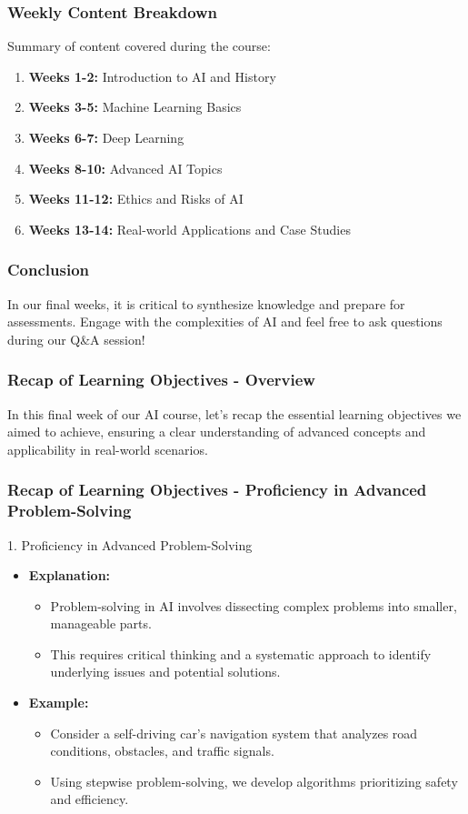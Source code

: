 \documentclass[aspectratio=169]{beamer}
\begin{document}
\begin{frame}[fragile]
    \frametitle{Weekly Content Breakdown}
    Summary of content covered during the course:
    \begin{enumerate}
        \item \textbf{Weeks 1-2:} Introduction to AI and History
        \item \textbf{Weeks 3-5:} Machine Learning Basics
        \item \textbf{Weeks 6-7:} Deep Learning
        \item \textbf{Weeks 8-10:} Advanced AI Topics
        \item \textbf{Weeks 11-12:} Ethics and Risks of AI
        \item \textbf{Weeks 13-14:} Real-world Applications and Case Studies
    \end{enumerate}
\end{frame}

\begin{frame}[fragile]
    \frametitle{Conclusion}
    In our final weeks, it is critical to synthesize knowledge and prepare for assessments. Engage with the complexities of AI and feel free to ask questions during our Q\&A session!
\end{frame}

\begin{frame}[fragile]
    \frametitle{Recap of Learning Objectives - Overview}
    In this final week of our AI course, let's recap the essential learning objectives we aimed to achieve, ensuring a clear understanding of advanced concepts and applicability in real-world scenarios.
\end{frame}

\begin{frame}[fragile]
    \frametitle{Recap of Learning Objectives - Proficiency in Advanced Problem-Solving}
    \begin{block}{1. Proficiency in Advanced Problem-Solving}
        \begin{itemize}
            \item \textbf{Explanation:}
            \begin{itemize}
                \item Problem-solving in AI involves dissecting complex problems into smaller, manageable parts.
                \item This requires critical thinking and a systematic approach to identify underlying issues and potential solutions.
            \end{itemize}
            \item \textbf{Example:}
            \begin{itemize}
                \item Consider a self-driving car's navigation system that analyzes road conditions, obstacles, and traffic signals.
                \item Using stepwise problem-solving, we develop algorithms prioritizing safety and efficiency.
            \end{itemize}
        \end{itemize}
    \end{block}
\end{frame}
\end{document}
